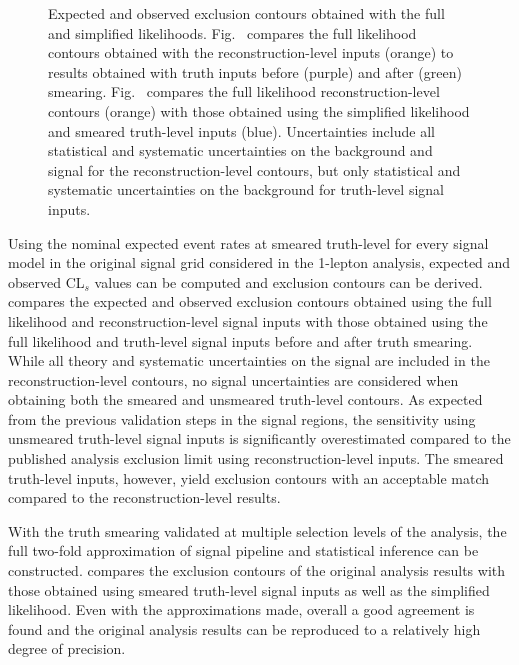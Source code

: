 \begin{figure}
\begin{subfigure}[b]{0.49\linewidth}
		\caption{\label{fig:simplified_truth_result}}
	\end{subfigure}\hfill
	\caption{Expected and observed exclusion contours obtained with the full and simplified likelihoods. Fig.~ compares the full likelihood contours obtained with the reconstruction-level inputs (orange) to results obtained with truth inputs before (purple) and after (green) smearing. Fig.~ compares the full likelihood reconstruction-level contours (orange) with those obtained using the simplified likelihood and smeared truth-level inputs (blue). Uncertainties include all statistical and systematic uncertainties on the background and signal for the reconstruction-level contours, but only statistical and systematic uncertainties on the background for truth-level signal inputs.}
	\label{fig:smearing_signal_regions}
\end{figure}

Using the nominal expected event rates at smeared truth-level for every signal model in the original signal grid considered in the 1-lepton analysis, expected and observed CL$_s$ values can be computed and exclusion contours can be derived.  compares the expected and observed exclusion contours obtained using the full likelihood and reconstruction-level signal inputs with those obtained using the full likelihood and truth-level signal inputs before and after truth smearing. While all theory and systematic uncertainties on the signal are included in the reconstruction-level contours, no signal uncertainties are considered when obtaining both the smeared and unsmeared truth-level contours. As expected from the previous validation steps in the signal regions, the sensitivity using unsmeared truth-level signal inputs is significantly overestimated compared to the published analysis exclusion limit using reconstruction-level inputs. The smeared truth-level inputs, however, yield exclusion contours with an acceptable match compared to the reconstruction-level results.

With the truth smearing validated at multiple selection levels of the analysis, the full two-fold approximation of signal pipeline and statistical inference can be constructed.  compares the exclusion contours of the original analysis results with those obtained using smeared truth-level signal inputs as well as the simplified likelihood. Even with the approximations made, overall a good agreement is found and the original analysis results can be reproduced to a relatively high degree of precision.

